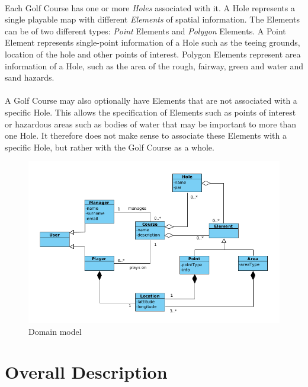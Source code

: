 \documentclass{article}
\begin{document}
    \paragraph{}
    Each Golf Course has one or more \textit{Holes} associated with it. A Hole
    represents a single playable map with different \textit{Elements} of spatial
    information. The Elements can be of two different types: \textit{Point}
    Elements and \textit{Polygon} Elements. A Point Element represents
    single-point information of a Hole such as the teeing grounds, location of
    the hole and other points of interest. Polygon Elements represent area
    information of a Hole, such as the area of the rough, fairway, green and
    water and sand hazards.

    \paragraph{}
    A Golf Course may also optionally have Elements that are not associated with
    a specific Hole. This allows the specification of Elements such as points of
    interest or hazardous areas such as bodies of water that may be important to
    more than one Hole. It therefore does not make sense to associate these
    Elements with a specific Hole, but rather with the Golf Course as a whole.
    
    \begin{figure}[h]
    	\centering
    	\includegraphics[scale=1]{DomainModel}
    	\caption{Domain model}
    	\label{domainmodel}
    \end{figure}

    \newpage

    \section{Overall Description} 
\end{document}
